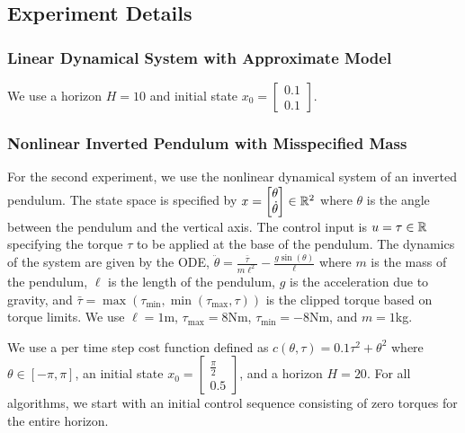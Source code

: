 \subsection{Experiment Details}
\label{sec:experiment-details}

\subsubsection{Linear Dynamical System with Approximate Model}
\label{sec:line-dynam-syst-1}

We use a horizon $H = 10$ and initial state $x_0 = \begin{bmatrix}0.1
  \\ 0.1 \end{bmatrix}$.

\subsubsection{Nonlinear Inverted Pendulum with Misspecified Mass}
\label{sec:nonl-invert-pend}

For the second experiment, we use the nonlinear dynamical system of an inverted
pendulum. The state space is specified by $x =
\begin{bmatrix}
  \theta \\
  \dot{\theta}
\end{bmatrix} \in \mathbb{R}^{2}
$ where $\theta$ is the angle between the pendulum and the vertical axis. The
control input is $u = \tau \in \mathbb{R}$ specifying the torque $\tau$ to be
applied at the base of the pendulum. The dynamics of the system are
given by the ODE,
$\ddot{\theta} = \frac{\bar{\tau}}{m\ell^{2}} - \frac{g\sin(\theta)}{\ell}$
where $m$ is the mass of the pendulum, $\ell$ is the length of the pendulum, $g$
is the acceleration due to gravity, and
$\bar{\tau} = \max(\tau_{\min}, \min(\tau_{\max}, \tau))$ is the clipped torque
based on torque limits. We use $\ell = 1$m, $\tau_{\max} = 8$Nm,
$\tau_{\min} = -8$Nm, and $m = 1$kg.

We use a per time step cost function defined as $c(\theta, \tau) =
0.1\tau^{2} + \theta^{2}$
where $\theta \in [-\pi, \pi]$, an initial state $x_{0} =
\begin{bmatrix}
  \frac{\pi}{2} \\ 0.5
\end{bmatrix}
$, and a horizon $H = 20$. For all algorithms, we start with an
initial control sequence consisting of zero torques for the entire horizon.

